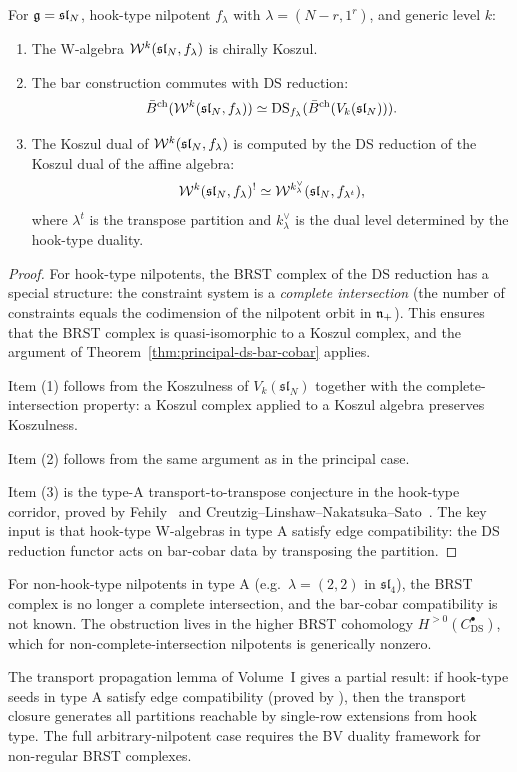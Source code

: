 \begin{theorem}
For $\mathfrak{g} = \mathfrak{sl}_N$, hook-type nilpotent $f_\lambda$ with
$\lambda = (N-r, 1^r)$, and generic level $k$:
\begin{enumerate}
\item The W-algebra $\mathcal{W}^k(\mathfrak{sl}_N, f_\lambda)$ is chirally
 Koszul.
\item The bar construction commutes with DS reduction:
 \[
 \bar{B}^{\mathrm{ch}}(\mathcal{W}^k(\mathfrak{sl}_N, f_\lambda))
 \simeq
 \mathrm{DS}_{f_\lambda}(\bar{B}^{\mathrm{ch}}(V_k(\mathfrak{sl}_N))).
 \]
\item The Koszul dual of $\mathcal{W}^k(\mathfrak{sl}_N, f_\lambda)$ is
 computed by the DS reduction of the Koszul dual of the affine
 algebra:
 \[
 \mathcal{W}^k(\mathfrak{sl}_N, f_\lambda)^!
 \simeq
 \mathcal{W}^{k^\vee_\lambda}(\mathfrak{sl}_N, f_{\lambda^t}),
 \]
 where $\lambda^t$ is the transpose partition and $k^\vee_\lambda$ is
 the dual level determined by the hook-type duality.
\end{enumerate}
\end{theorem}

\begin{proof}
For hook-type nilpotents, the BRST complex of the DS reduction has a
special structure: the constraint system is a \emph{complete
intersection} (the number of constraints equals the codimension of
the nilpotent orbit in $\mathfrak{n}_+$). This ensures that the BRST complex
is quasi-isomorphic to a Koszul complex, and the argument of
Theorem~\ref{thm:principal-ds-bar-cobar} applies.

Item (1) follows from the Koszulness of $V_k(\mathfrak{sl}_N)$
together with the complete-intersection property: a Koszul
complex applied to a Koszul algebra preserves Koszulness.

Item (2) follows from the same argument as in the principal case.

Item (3) is the type-A transport-to-transpose conjecture in the
hook-type corridor, proved by Fehily~\cite{Fehily23} and
Creutzig--Linshaw--Nakatsuka--Sato~\cite{CLNS24}. The key input is
that hook-type W-algebras in type A satisfy edge compatibility: the
DS reduction functor acts on bar-cobar data by transposing the
partition.
\end{proof}

\begin{remark}
For non-hook-type nilpotents in type A (e.g.\ $\lambda = (2,2)$ in
$\mathfrak{sl}_4$), the BRST complex is no longer a complete
intersection, and the bar-cobar compatibility is not known. The
obstruction lives in the higher BRST cohomology $H^{>0}(C^\bullet_{\mathrm{DS}})$,
which for non-complete-intersection nilpotents is generically nonzero.

The transport propagation lemma of Volume~I gives a partial result:
if hook-type seeds in type A satisfy edge compatibility (proved by
\cite{CLNS24}), then the transport closure generates all partitions
reachable by single-row extensions from hook type. The full
arbitrary-nilpotent case requires the BV duality framework for non-regular
BRST complexes.
\end{remark}

